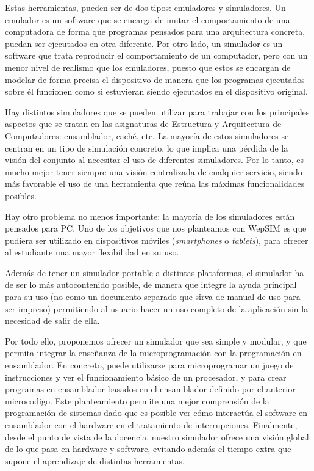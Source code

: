 Estas herramientas, pueden ser de dos tipos: emuladores y simuladores. Un emulador es un software que se encarga de imitar el comportamiento de una computadora de forma que programas pensados para una arquitectura concreta, puedan ser ejecutados en otra diferente. Por otro lado, un simulador es un software que trata reproducir el comportamiento de un computador, pero con un menor nivel de realismo que los emuladores, puesto que estos se encargan de modelar de forma precisa el dispositivo de manera que los programas ejecutados sobre él funcionen como si estuvieran siendo ejecutados en el dispositivo original.

Hay distintos simuladores que se pueden utilizar para trabajar con los principales aspectos que se tratan en las asignaturas de Estructura y Arquitectura de Computadores: ensamblador, caché, etc. La mayoría de estos simuladores se centran en un tipo de simulación concreto, lo que implica una pérdida de la visión del conjunto al necesitar el uso de diferentes simuladores. Por lo tanto, es mucho mejor tener siempre una visión centralizada de cualquier servicio, siendo más favorable el uso de una herramienta que reúna las máximas funcionalidades posibles.

Hay otro problema no menos importante: la mayoría de los simuladores están pensados para PC. Uno de los objetivos que nos planteamos con WepSIM es que pudiera ser utilizado en dispositivos móviles (\emph{smartphones} o \emph{tablets}), para ofrecer al estudiante una mayor flexibilidad en su uso.

Además de tener un simulador portable a distintas plataformas, el simulador ha de ser lo más autocontenido posible, de manera que integre la ayuda principal para su uso (no como un documento separado que sirva de manual de uso para ser impreso) permitiendo al usuario hacer un uso completo de la aplicación sin la necesidad de salir de ella.

Por todo ello, proponemos ofrecer un simulador que sea simple y modular, y que permita integrar la enseñanza de la microprogramación con la programación en ensamblador. En concreto, puede utilizarse para microprogramar un juego de instrucciones y ver el funcionamiento básico de un procesador, y para crear programas en ensamblador basados en el ensamblador definido por el anterior \gls{microcodigo}. Este planteamiento permite una mejor comprensión de la programación de sistemas dado que es posible ver cómo interactúa el software en ensamblador con el hardware en el tratamiento de interrupciones. Finalmente, desde el punto de vista de la docencia, nuestro simulador ofrece una visión global de lo que pasa en hardware y software, evitando además el tiempo extra que supone el aprendizaje de distintas herramientas.


